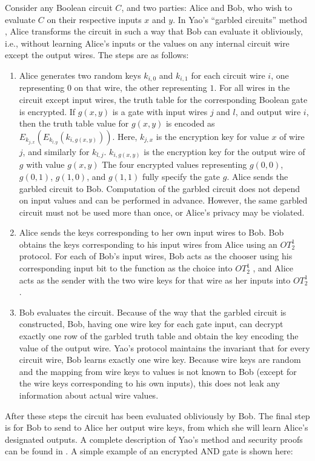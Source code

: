 Consider any Boolean circuit $C$, and two parties: Alice and Bob,
who wish to evaluate $C$ on their respective inputs $x$ and $y$.
In Yao's {}``garbled circuits'' method \cite{Yao86}, Alice transforms
the circuit in such a way that Bob can evaluate it obliviously, i.e.,
without learning Alice's inputs or the values on any internal circuit
wire except the output wires. The steps are as follows: 
\begin{enumerate}
\item Alice generates two random keys $k_{i,0}$ and $k_{i,1}$ for each
circuit wire $i$, one representing $0$ on that wire, the other representing
$1$. For all wires in the circuit except input wires, the truth table
for the corresponding Boolean gate is encrypted. If $g(x,y)$ is a
gate with input wires $j$ and $l$, and output wire $i$, then the
truth table value for $g(x,y)$ is encoded as $E_{k_{j,x}}\left(E_{k_{l,y}}\left(k_{i,g(x,y)}\right)\right)$.
Here, $k_{j,x}$ is the encryption key for value $x$ of wire $j$,
and similarly for $k_{l,j}$. $k_{i,g(x,y)}$ is the encryption key
for the output wire of $g$ with value $g(x,y)$ The four encrypted
values representing $g(0,0)$, $g(0,1)$, $g(1,0)$, and $g(1,1)$
fully specify the gate $g$. Alice sends the garbled circuit to Bob.
Computation of the garbled circuit does not depend on input values
and can be performed in advance. However, the same garbled circuit
must not be used more than once, or Alice's privacy may be violated. 
\item Alice sends the keys corresponding to her own input wires to Bob.
Bob obtains the keys corresponding to his input wires from Alice using
an $OT_{2}^{1}$ protocol. For each of Bob's input wires, Bob acts
as the chooser using his corresponding input bit to the function as
the choice into $OT_{2}^{1}$ , and Alice acts as the sender with
the two wire keys for that wire as her inputs into $OT_{2}^{1}$ . 
\item Bob evaluates the circuit. Because of the way that the garbled circuit
is constructed, Bob, having one wire key for each gate input, can
decrypt exactly one row of the garbled truth table and obtain the
key encoding the value of the output wire. Yao's protocol maintains
the invariant that for every circuit wire, Bob learns exactly one
wire key. Because wire keys are random and the mapping from wire keys
to values is not known to Bob (except for the wire keys corresponding
to his own inputs), this does not leak any information about actual
wire values. 
\end{enumerate}
After these steps the circuit has been evaluated obliviously by Bob.
The final step is for Bob to send to Alice her output wire keys, from
which she will learn Alice's designated outputs. A complete description
of Yao's method and security proofs can be found in \cite{Goldreich:vol2}.
A simple example of an encrypted AND gate is shown here:

